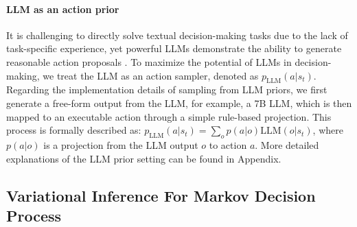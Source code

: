\documentclass{article} %
\theoremstyle{plain}
\theoremstyle{definition}
\theoremstyle{remark}
\begin{document}
\paragraph{LLM as an action prior}
It is challenging to directly solve textual decision-making tasks due to the lack of task-specific experience, yet powerful LLMs demonstrate the ability to generate reasonable action proposals \cite{yao2024tree, hao2023reasoning}. To maximize the potential of LLMs in decision-making, we treat the LLM as an action sampler, denoted as $p_{\text{LLM}}(a|s_t)$. Regarding the implementation details of sampling from LLM priors, we first generate a free-form output from the LLM, for example, a 7B LLM, which is then mapped to an executable action through a simple rule-based projection. This process is formally described as: $p_{\text{LLM}}(a|s_t) = \sum_o p(a|o)\text{LLM}(o|s_t)$, where $p(a|o)$ is a projection from the LLM output $o$ to action $a$. More detailed explanations of the LLM prior setting can be found in Appendix.
\subsection{Variational Inference For Markov Decision Process}
\end{document}

